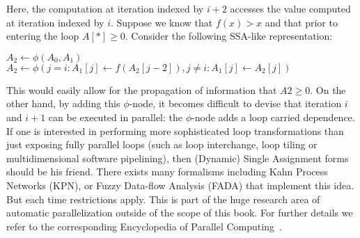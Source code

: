 \noindent
Here, the computation at iteration indexed by $i+2$ accesses the value computed at iteration indexed by $i$. Suppose we know that $f(x)>x$ and that prior to entering the loop $A[*]\geq 0$.
Consider the following SSA-like representation:

{
\LinesNotNumbered
\begin{algorithm}[H]
   {
    $A_2 \gets \phi(A_0,A_1)$\; 
    $A_2 \gets \phi(j=i : A_1[j] \gets f(A_2[j-2]), j\neq i:A_1[j] \gets A_2[j])$\;
  }
\end{algorithm}
}


\noindent
This would easily allow for the propagation of information that $A2\geq 0$. 
On the other hand, by adding this $\phi$-node, it becomes difficult to devise that iteration $i$ and $i+1$ can be executed in parallel: 
the $\phi$-node adds a loop carried dependence. 
If one is interested in performing more sophisticated loop transformations than just exposing fully parallel loops (such as loop interchange, loop tiling or multidimensional software pipelining), then (Dynamic) Single Assignment forms should be his friend. 
There exists many formalisms including Kahn Process Networks (KPN), or Fuzzy Data-flow Analysis (FADA) that implement this idea. 
But each time restrictions apply. 
This is part of the huge research area of automatic parallelization outside of the scope of this book. 
For further details we refer to the corresponding Encyclopedia of Parallel Computing~\cite{Padua}.
